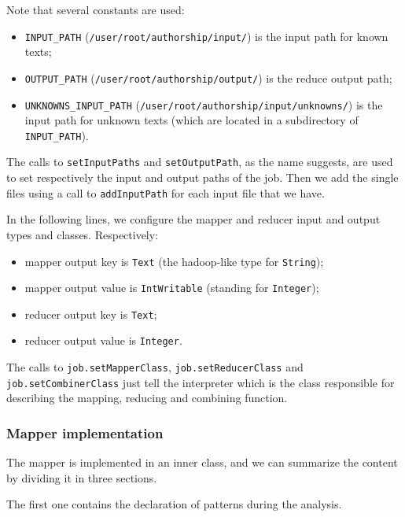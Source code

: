 \documentclass[a4paper,11pt, twoside]{article}
\begin{document}
		\noindent
		Note that several constants are used: \begin{itemize}
			\item \lstinline|INPUT_PATH| (\lstinline|/user/root/authorship/input/|) is the input path for known texts;
			\item \lstinline|OUTPUT_PATH| (\lstinline|/user/root/authorship/output/|) is the reduce output path;
			\item \lstinline|UNKNOWNS_INPUT_PATH| (\lstinline|/user/root/authorship/input/unknowns/|) is the input path for unknown texts (which are located in a subdirectory of \lstinline|INPUT_PATH|).
		\end{itemize}

		\noindent
		The calls to \lstinline|setInputPaths| and \lstinline|setOutputPath|, as the name suggests, are used to set respectively the input and output paths of the job. Then we add the single files using a call to \lstinline|addInputPath| for each input file that we have. 
		
		\bigskip
		\noindent
		In the following lines, we configure the mapper and reducer input and output types and classes.
		Respectively: \begin{itemize}
			\item mapper output key is \lstinline|Text| (the hadoop-like type for \lstinline|String|);
			\item mapper output value is \lstinline|IntWritable| (standing for \lstinline|Integer|);
			\item reducer output key is \lstinline|Text|;
			\item reducer output value is \lstinline|Integer|.
		\end{itemize}

		\noindent
		The calls to \lstinline|job.setMapperClass|, \lstinline|job.setReducerClass| and \lstinline|job.setCombinerClass| just tell the interpreter which is the class responsible for describing the mapping, reducing and combining function.
		
	\subsubsection{Mapper implementation} 
		
		The mapper is implemented in an inner class, and we can summarize the content by dividing it in three sections.

		\noindent
		The first one contains the declaration of patterns during the analysis.
	
\end{document}
